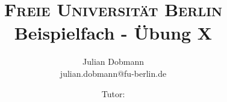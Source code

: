 \documentclass[fleqn]{article}
\begin{document}
\title{
    {\small \textsc{Freie Universität Berlin}}\\[0.2cm]
    {\Huge Beispielfach - Übung X}\\
}
\author{Julian Dobmann \\ julian.dobmann@fu-berlin.de \and Tutor:}
\maketitle
\end{document}
